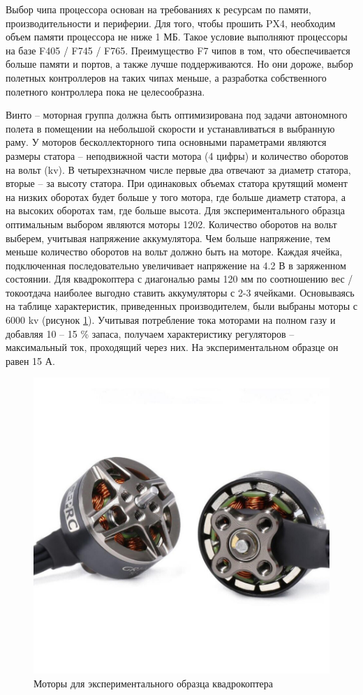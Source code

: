 Выбор чипа процессора основан на требованиях к ресурсам по памяти, производительности и периферии. Для того, чтобы прошить PX4, необходим объем памяти процессора не ниже 1 МБ. Такое условие выполняют процессоры на базе F405 / F745 / F765. Преимущество F7 чипов в том, что обеспечивается больше памяти и портов, а также лучше поддерживаются. Но они дороже, выбор полетных контроллеров на таких чипах меньше, а разработка собственного полетного контроллера пока не целесообразна.

Винто -- моторная группа должна быть оптимизирована под задачи автономного полета в помещении на небольшой скорости и устанавливаться в выбранную раму. У моторов бесколлекторного типа основными параметрами являются размеры статора -- неподвижной части мотора (4 цифры) и количество оборотов на вольт (kv). В четырехзначном числе первые два отвечают за диаметр статора, вторые -- за высоту статора. При одинаковых объемах статора крутящий момент на низких оборотах будет больше у того мотора, где больше диаметр статора, а на высоких оборотах там, где больше высота. Для экспериментального образца оптимальным выбором являются моторы 1202. Количество оборотов на вольт выберем, учитывая напряжение аккумулятора. Чем больше напряжение, тем меньше количество оборотов на вольт должно быть на моторе. Каждая ячейка, подключенная последовательно увеличивает напряжение на 4.2 В в заряженном состоянии. Для квадрокоптера с диагональю рамы 120 мм по соотношению вес / токоотдача наиболее выгодно ставить аккумуляторы с 2-3 ячейками. Основываясь на таблице характеристик, приведенных производителем, были выбраны моторы с 6000 kv (рисунок \ref{fig:motor}).
Учитывая потребление тока моторами на полном газу и добавляя 10 -- 15 \% запаса, получаем характеристику регуляторов -- максимальный ток, проходящий через них. На экспериментальном образце он равен 15 А.
\begin{figure}[H]
	\centering
	\includegraphics[width=0.5\linewidth]{../RW/pics/motor}
	\caption{Моторы для экспериментального образца квадрокоптера
	}
	\label{fig:motor} %
\end{figure}


